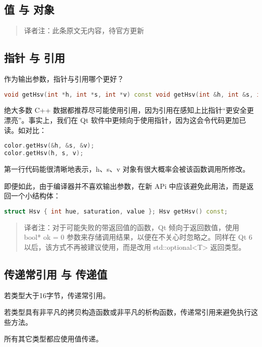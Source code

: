 \subsection{值 与 对象}

\begin{quote}
译者注：此条原文无内容，待官方更新
\end{quote}

\subsection{指针 与 引用}

作为输出参数，指针与引用哪个更好？

\begin{lstlisting}[language=C++]
void getHsv(int *h, int *s, int *v) const void getHsv(int &h, int &s, int &v) const
\end{lstlisting}

绝大多数 C++ 数据都推荐尽可能使用引用，因为引用在感知上比指针“更安全更漂亮”。事实上，我们在 Qt 软件中更倾向于使用指针，因为这会令代码更加已读。如对比：


\begin{lstlisting}[language=C++]
color.getHsv(&h, &s, &v);
color.getHsv(h, s, v);
\end{lstlisting}

第一行代码能很清晰地表示，h、s、v 对象有很大概率会被该函数调用所修改。

即便如此，由于编译器并不喜欢输出参数，在新 APi 中应该避免此用法，而是返回一个小结构体：

\begin{lstlisting}[language=C++]
struct Hsv { int hue, saturation, value }; Hsv getHsv() const;
\end{lstlisting}

\begin{quote}
	译者注：对于可能失败的带返回值的函数，Qt 倾向于返回数值，使用 bool* ok = 0 参数来存储调用结果，以便在不关心时忽略之。同样在 Qt 6 以后，该方式不再被建议使用，而是改用 std::optional<T> 返回类型。
\end{quote}

\subsection{传递常引用 与 传递值}
若类型大于16字节，传递常引用。

若类型具有非平凡的拷贝构造函数或非平凡的析构函数，传递常引用来避免执行这些方法。

所有其它类型都应使用值传递。

